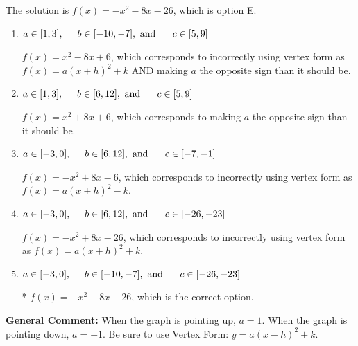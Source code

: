 \documentclass{extbook}[14pt]
\begin{document}
\begin{enumerate}
{The solution is \( f(x) = -x^{2} -8 x -26 \), which is option E.\begin{enumerate}[label=\Alph*.]
\item \( a \in [1, 3], \hspace*{5mm} b \in [-10, -7], \text{ and } \hspace*{5mm} c \in [5, 9] \)

$f(x)=x^{2} -8 x + 6$, which corresponds to incorrectly using vertex form as $f(x) = a(x+h)^2+k$ AND making $a$ the opposite sign than it should be.
\item \( a \in [1, 3], \hspace*{5mm} b \in [6, 12], \text{ and } \hspace*{5mm} c \in [5, 9] \)

$f(x)=x^{2} +8 x + 6$, which corresponds to making $a$ the opposite sign than it should be.
\item \( a \in [-3, 0], \hspace*{5mm} b \in [6, 12], \text{ and } \hspace*{5mm} c \in [-7, -1] \)

$f(x)=-x^{2} +8 x -6$, which corresponds to incorrectly using vertex form as $f(x) = a(x+h)^2 - k$.
\item \( a \in [-3, 0], \hspace*{5mm} b \in [6, 12], \text{ and } \hspace*{5mm} c \in [-26, -23] \)

$f(x)=-x^{2} +8 x -26$, which corresponds to incorrectly using vertex form as $f(x) = a(x+h)^2+k$.
\item \( a \in [-3, 0], \hspace*{5mm} b \in [-10, -7], \text{ and } \hspace*{5mm} c \in [-26, -23] \)

* $f(x)=-x^{2} -8 x -26$, which is the correct option.
\end{enumerate}

\textbf{General Comment:} When the graph is pointing up, $a=1$. When the graph is pointing down, $a=-1$. Be sure to use Vertex Form: $y = a(x-h)^2+k$.
}
\end{enumerate}
\end{document}
